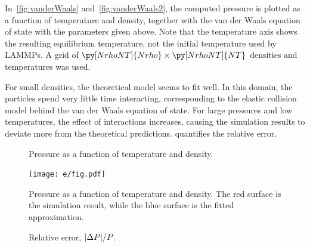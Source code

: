 \documentclass[11pt,british,a4paper]{report}
\begin{document}
In~\vref{fig:vanderWaals} and~\vref{fig:vanderWaals2}, the computed pressure is plotted as a function of temperature and density, together with the van der Waals equation of state with the parameters given above.
Note that the temperature axis shows the resulting equilibrium temperature, not the initial temperature used by LAMMPs. A grid of \(\py[NrhoNT]{Nrho}\times\py[NrhoNT]{NT}\) densities and temperatures was used.

For small densities, the theoretical model seems to fit well.
In this domain, the particles spend very little time interacting, corresponding to the elastic collision model behind the van der Waals equation of state. For large pressures and low temperatures, the effect of interactions increases, causing the simulation results to deviate more from the theoretical predictions.
 quantifies the relative error.

\begin{figure}[htbp]
    \centering
    \caption{Pressure as a function of temperature and density.}\label{fig:vanderWaals}
\end{figure}
\begin{figure}[htbp]
    \centering
    \texttt{[image: e/fig.pdf]}
    \caption{Pressure as a function of temperature and density. The red surface is the simulation result, while the blue surface is the fitted approximation.}\label{fig:vanderWaals2}
\end{figure}
\begin{figure}[htbp]
    \centering
    \caption{Relative error, \(\abs{\Delta P}/P\).}\label{fig:Perror}
\end{figure}
\end{document}
